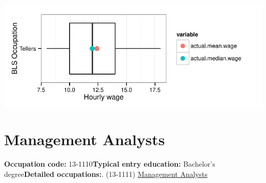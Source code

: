 \documentclass[a4paper,10pt]{article}\usepackage[]{graphicx}\usepackage[]{color}
\makeatletter
\def\maxwidth{ %
  \ifdim\Gin@nat@width>\linewidth
    \linewidth
  \else
    \Gin@nat@width
  \fi
}
\makeatother
\begin{document}
{\centering \includegraphics[width=\maxwidth]{figure/unnamed-chunk-259} 

}


\newpage\section{Management Analysts}\textbf{Occupation code:} 13-1110\newline\textbf{Typical entry education:} Bachelor's degree\newline\textbf{Detailed occupations:}. (13-1111)  \href{http://www.bls.gov/oes/current/oes131111.htm}{Management Analysts}\newline%
\end{document}
